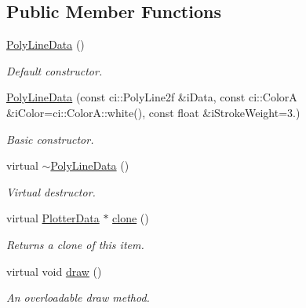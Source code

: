 \subsection*{Public Member Functions}
\begin{DoxyCompactItemize}
\item 
\hypertarget{class_poly_line_data_a0abf8c7f195d3eb65ea07c675ea4a52f}{\hyperlink{class_poly_line_data_a0abf8c7f195d3eb65ea07c675ea4a52f}{Poly\-Line\-Data} ()}\label{class_poly_line_data_a0abf8c7f195d3eb65ea07c675ea4a52f}

\begin{DoxyCompactList}\small\item\em Default constructor. \end{DoxyCompactList}\item 
\hypertarget{class_poly_line_data_a5153e14acd22a7aa97e1bb37fd84dea7}{\hyperlink{class_poly_line_data_a5153e14acd22a7aa97e1bb37fd84dea7}{Poly\-Line\-Data} (const ci\-::\-Poly\-Line2f \&i\-Data, const ci\-::\-Color\-A \&i\-Color=ci\-::\-Color\-A\-::white(), const float \&i\-Stroke\-Weight=3.)}\label{class_poly_line_data_a5153e14acd22a7aa97e1bb37fd84dea7}

\begin{DoxyCompactList}\small\item\em Basic constructor. \end{DoxyCompactList}\item 
\hypertarget{class_poly_line_data_a014782b028129033f7c4bc73990bd565}{virtual \hyperlink{class_poly_line_data_a014782b028129033f7c4bc73990bd565}{$\sim$\-Poly\-Line\-Data} ()}\label{class_poly_line_data_a014782b028129033f7c4bc73990bd565}

\begin{DoxyCompactList}\small\item\em Virtual destructor. \end{DoxyCompactList}\item 
\hypertarget{class_poly_line_data_abb4b40deb900d73bf5ff7e4775b207f8}{virtual \hyperlink{class_plotter_data}{Plotter\-Data} $\ast$ \hyperlink{class_poly_line_data_abb4b40deb900d73bf5ff7e4775b207f8}{clone} ()}\label{class_poly_line_data_abb4b40deb900d73bf5ff7e4775b207f8}

\begin{DoxyCompactList}\small\item\em Returns a clone of this item. \end{DoxyCompactList}\item 
\hypertarget{class_poly_line_data_a992ac9cb7fd7bfc38e5d7b1e727982ba}{virtual void \hyperlink{class_poly_line_data_a992ac9cb7fd7bfc38e5d7b1e727982ba}{draw} ()}\label{class_poly_line_data_a992ac9cb7fd7bfc38e5d7b1e727982ba}

\begin{DoxyCompactList}\small\item\em An overloadable draw method. \end{DoxyCompactList}\end{DoxyCompactItemize}
